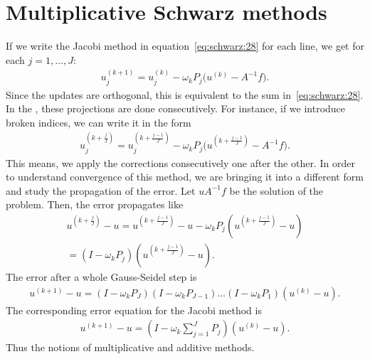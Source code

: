 \section{Multiplicative Schwarz methods}

\begin{example}
  If we write the Jacobi method in equation~\eqref{eq:schwarz:28} for
  each line, we get for each $j=1,\ldots,J$:
  \begin{gather}
    \label{eq:schwarz:29}
      u_j^{(k+1)} = u_j^{(k)} - \omega_k P_j \bigl(u^{(k)} - A^{-1}f\bigr).
  \end{gather}
  Since the updates are orthogonal, this is equivalent to the sum
  in~\eqref{eq:schwarz:28}. In the , these
  projections are done consecutively. For instance, if we introduce
  broken indices, we can write it in the form
  \begin{gather}
    \label{eq:schwarz:30}
      u_j^{(k+\frac{j}{J})} = u_j^{(k+\frac{j-1}{J})}
      - \omega_k P_j \bigl(u^{(k+\frac{j-1}{J})} - A^{-1}f\bigr).
  \end{gather}
  This means, we apply the corrections consecutively one after the
  other. In order to understand convergence of this method, we are
  bringing it into a different form and study the propagation of the
  error. Let $uA^{-1}f$ be the solution of the problem. Then, the
  error propagates like
  \begin{multline}
    \label{eq:schwarz:31}
      u^{(k+\frac{j}{J})} - u = u^{(k+\frac{j-1}{J})} - u
      - \omega_k P_j \left(u^{(k+\frac{j-1}{J})} - u\right) \\
      = (I-\omega_k P_j) \left(u^{(k+\frac{j-1}{J})} - u\right).
  \end{multline}
  The error after a whole Gauss-Seidel step is
  \begin{gather}
    \label{eq:schwarz:32}
      u^{(k+1)} - u
      = (I-\omega_k P_J)(I-\omega_k P_{J-1})\dots(I-\omega_k P_1) \left(u^{(k)} - u\right).
  \end{gather}
  The corresponding error equation for the Jacobi method is
  \begin{gather}
    \label{eq:schwarz:33}
    u^{(k+1)} - u = \left(I-\omega_k \sum_{j=1}^J P_j\right) \left(u^{(k)} - u\right).
  \end{gather}
  Thus the notions of multiplicative and additive methods.
\end{example}

